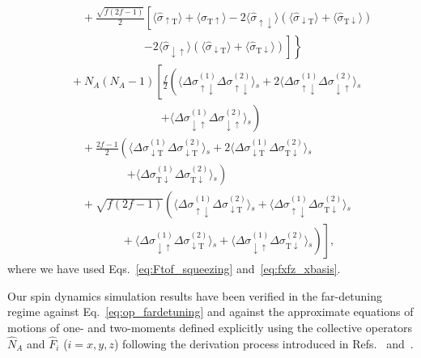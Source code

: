 \documentclass[aps,pra,twocolumn,superscriptaddress]{revtex4-1} %
\newcommand{\nn}{\nonumber}
\newcommand{\expect}[1]{\big\langle #1 \big\rangle}
\newcommand{\sigmaud}{\hat{\sigma}_{\uparrow\downarrow}}
\newcommand{\sigmaut}{\hat{\sigma}_{\uparrow \mathrm{T}}}
\newcommand{\sigmadu}{\hat{\sigma}_{\downarrow\uparrow}}
\newcommand{\sigmadt}{\hat{\sigma}_{\downarrow \mathrm{T}}}
\newcommand{\sigmatu}{\hat{\sigma}_{\mathrm{T}\uparrow}}
\newcommand{\sigmatd}{\hat{\sigma}_{\mathrm{T}\downarrow}}
\newcommand{\Dsigmaud}{\Delta\sigma_{\uparrow\downarrow}}
\newcommand{\Dsigmadu}{\Delta\sigma_{\downarrow\uparrow}}
\newcommand{\Dsigmadt}{\Delta\sigma_{\downarrow \mathrm{T}}}
\newcommand{\Dsigmatd}{\Delta\sigma_{\mathrm{T}\downarrow}}
\begin{document}
\begin{appendix}
\begin{subequations}
\begin{align}
	&\quad\quad +\! \frac{\!\sqrt{f(2f\!-\!1)}}{2}\!\left[\!\expect{\!\sigmaut\! }\!+\!\expect{\!\sigmatu\!} \!-\!2\expect{\!\sigmaud}(\expect{\!\sigmadt\!}\!+\!\expect{\!\sigmatd})\right.\nn\\
	&\quad\quad\quad\quad\quad\quad\quad \left.\phantom{\frac{1}{1}}\left.-\!2\expect{\!\sigmadu\!}(\expect{\!\sigmadt\!}\!+\!\expect{\!\sigmatd} ) \right]\! \right\}\nn\\
	&\quad +\!N_A(N_A\!-\!1)\!\left[\!\frac{f}{2}\left(\expect{\!\Dsigmaud^{(\!1\!)}\Dsigmaud^{(\!2\!)} }\!_s \!+\! 2\expect{\!\Dsigmaud^{(\!1\!)}\Dsigmadu^{(\!2\!)} }\!_s \right.\right.\nn\\
	&\quad\quad\quad\quad\quad\quad\quad\quad\quad \left.+\! \expect{\!\Dsigmadu^{(\!1\!)}\Dsigmadu^{(\!2\!)} }\!_s \right) \nn\\
	&\quad\quad +\! \frac{2f\!-\!1}{2}\left(\expect{\!\Dsigmadt^{(\!1\!)}\Dsigmadt^{(\!2\!)} }\!_s \!+\!2\expect{\!\Dsigmadt^{(\!1\!)}\Dsigmatd^{(\!2\!)} }\!_s\right. \nn\\
	&\quad\quad\quad\quad\quad\quad \left. +\!\expect{\!\Dsigmatd^{(\!1\!)}\Dsigmatd^{(\!2\!)} }\!_s\right) \nn\\
	&\quad\quad +\! \left. \sqrt{\!f(2f\!-\!1)}\left(\expect{\!\Dsigmaud^{(\!1\!)}\Dsigmadt^{(\!2\!)} }\!_s \!+\!\expect{\!\Dsigmaud^{(\!1\!)}\Dsigmatd^{(\!2\!)} }\!_s\right.\right.\nn\\ &\quad\quad\quad\quad\quad\left.\phantom{\frac{1}{1}}\left.\!+\!\expect{\!\Dsigmadu^{(\!1\!)}\Dsigmadt^{(\!2\!)} }\!_s\!+\!\expect{\!\Dsigmadu^{(\!1\!)}\Dsigmatd^{(\!2\!)} }\!_s \right)\!\right]\!,\label{eq:DeltaFz2_qutrit}
	\end{align}
\end{subequations}
where we have used Eqs.~\eqref{eq:Ftof_squeezing} and~\eqref{eq:fxfz_xbasis}.

Our spin dynamics simulation results have been verified in the far-detuning regime against Eq.~\eqref{eq:op_fardetuning} and against the approximate equations of motions of one- and two-moments defined explicitly using the collective operators $ \hat{N}_A $ and $ \hat{F}_i $ ($ i=x,y,z $) following the derivation process introduced in Refs.~\cite{Qi2016} and~\cite{Norris2014}.



\end{appendix}
\end{document}
